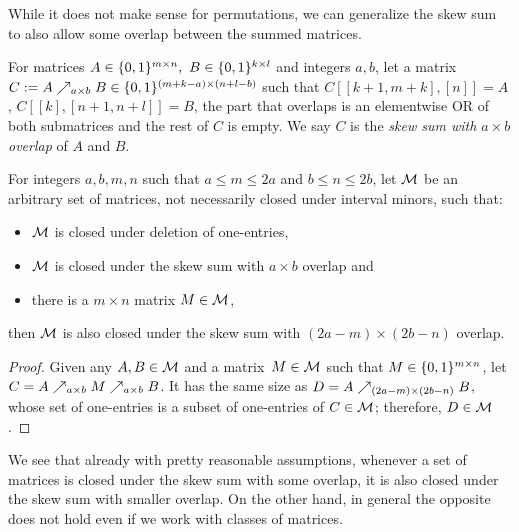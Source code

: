 While it does not make sense for permutations, we can generalize the skew sum to also allow some overlap between the summed matrices.

\begin{defn}
For matrices $A\in\{0,1\}^{m\times n},\ B\in\{0,1\}^{k\times l}$ and integers $a,b$, let a matrix~$C:=A\nearrow_{a\times b}B\in\{0,1\}^{(m+k-a)\times(n+l-b)}$ such that $C[[k+1,m+k],[n]]=A$, $C[[k],[n+1,n+l]]=B$, the part that overlaps is an elementwise OR of both submatrices and the rest of $C$ is empty. We say $C$ is the \emph{skew sum with $a\times b$ overlap} of $A$ and $B$.
\end{defn}

\begin{thm}
For integers $a,b,m,n$ such that $a\leq m\leq2a$ and $b\leq n\leq2b$, let $\mathcal{M}$ be an arbitrary set of matrices, not necessarily closed under interval minors, such that:
\begin{itemize}
	\item $\mathcal{M}$ is closed under deletion of one-entries,
	\item $\mathcal{M}$ is closed under the skew sum with $a\times b$ overlap and
	\item there is a $m\times n$ matrix $M\in\mathcal{M}$,
\end{itemize}
then $\mathcal{M}$ is also closed under the skew sum with $(2a-m)\times(2b-n)$ overlap.
\end{thm}
\begin{proof}
Given any $A,B\in\mathcal{M}$ and a matrix~$M\in\mathcal{M}$ such that $M\in\{0,1\}^{m\times n}$, let $C=A\nearrow_{a\times b}M\nearrow_{a\times b}B$. It has the same size as $D=A\nearrow_{(2a-m)\times(2b-n)}B$, whose set of one-entries is a subset of one-entries of $C\in\mathcal{M}$; therefore, $D\in\mathcal{M}$.
\end{proof}

We see that already with pretty reasonable assumptions, whenever a set of matrices is closed under the skew sum with some overlap, it is also closed under the skew sum with smaller overlap. On the other hand, in general the opposite does not hold even if we work with classes of matrices.


